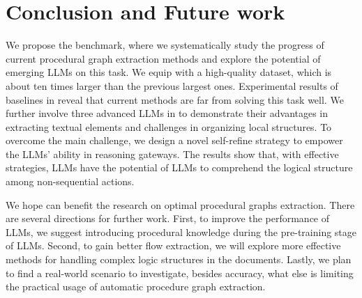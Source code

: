 

\section{Conclusion and Future work
}

We propose the \benchmark benchmark, where we systematically study the progress of current procedural graph extraction methods and explore the potential of emerging LLMs on this task. We equip \benchmark with a high-quality dataset, which is about ten times larger than the previous largest ones. Experimental results of baselines in \benchmark reveal that current methods are far from solving this task well. We further involve three advanced LLMs in \benchmark to demonstrate their advantages in extracting textual elements and challenges in organizing local structures. To overcome the main challenge, we design a novel self-refine strategy to empower the LLMs' ability in reasoning gateways. The results show that, with effective strategies, LLMs have the potential of LLMs to comprehend the logical structure among non-sequential actions.

We hope \benchmark can benefit the research on optimal procedural graphs extraction. There are several directions for further work.
First, to improve the performance of LLMs, we suggest introducing procedural knowledge during the pre-training stage of LLMs.
Second, to gain better flow extraction, we will explore more effective methods for handling complex logic structures in the documents.
Lastly, we plan to find a real-world scenario to investigate, besides accuracy, what else is limiting the practical usage of automatic procedure graph extraction.
